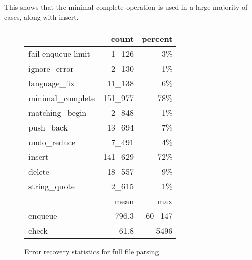 \documentclass[authordraft]{acmart}
\begin{document}
This shows that the minimal complete operation is used in a large
majority of cases, along with insert.

\begin{figure}[H]
\caption{Error recovery statistics for full file parsing}
\begin{tabular}{l r r}
\toprule
                   & count    & percent \\
\midrule
fail enqueue limit & 1\_126   & 3\%     \\
ignore\_error      & 2\_130   & 1\%     \\
language\_fix      & 11\_138  & 6\%     \\
minimal\_complete  & 151\_977 & 78\%    \\
matching\_begin    & 2\_848   & 1\%     \\
push\_back         & 13\_694  & 7\%     \\
undo\_reduce       & 7\_491   & 4\%     \\
insert             & 141\_629 & 72\%    \\
delete             & 18\_557  & 9\%     \\
string\_quote      & 2\_615   & 1\%     \\
\bottomrule
                   & mean     & max     \\
\midrule
enqueue            & 796.3    & 60\_147 \\
check              & 61.8     & 5496    \\
\bottomrule
\end{tabular}
\label{table:full-recover-stats}
\end{figure}
\end{document}
